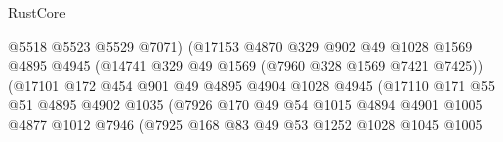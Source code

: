 \begin{lexlean}{RustCore}
\begin{coremodule}
                                          @5518
                                          @5523
                                          @5529
                                          @7071)
                                        (@17153
                                          @4870
                                          @329
                                          @902
                                          @49
                                          @1028
                                          @1569
                                          @4895
                                          @4945
                                          (@14741 @329 @49 @1569 (@7960 @328 @1569 @7421 @7425))
                                          (@17101
                                            @172
                                            @454
                                            @901
                                            @49
                                            @4895
                                            @4904
                                            @1028
                                            @4945
                                            (@17110
                                              @171
                                              @55
                                              @51
                                              @4895
                                              @4902
                                              @1035
                                              (@7926
                                                @170
                                                @49
                                                @54
                                                @1015
                                                @4894
                                                @4901
                                                @1005
                                                @4877
                                                @1012
                                                @7946
                                                (@7925
                                                  @168
                                                  @83
                                                  @49
                                                  @53
                                                  @1252
                                                  @1028
                                                  @1045
                                                  @1005

\end{coremodule}
\end{lexlean}
